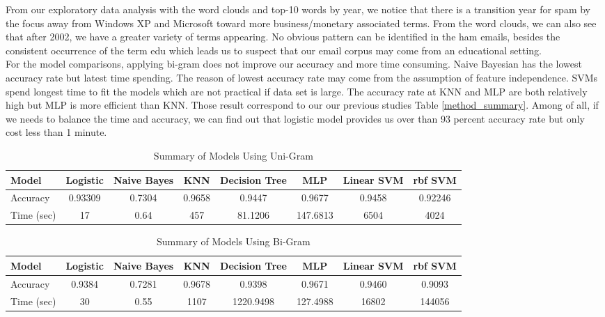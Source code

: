 From our exploratory data analysis with the word clouds and top-10 words by year, we notice that there is a transition year for spam by the focus away from Windows XP and Microsoft toward more business/monetary associated terms. From the word clouds, we can also see that after 2002, we have a greater variety of terms appearing. No obvious pattern can be identified in the ham emails, besides the consistent occurrence of the term edu which leads us to suspect that our email corpus may come from an educational setting.\\

For the model comparisons, applying bi-gram does not improve our accuracy and more time consuming. Naive Bayesian has the lowest accuracy rate but latest time spending. The reason of lowest accuracy rate may come from the assumption of feature independence. SVMs spend longest time to fit the models which are not practical if data set is large. The accuracy rate at KNN and MLP are both relatively high but MLP is more efficient than KNN. Those result correspond to our our previous studies Table \ref{method_summary}. Among of all, if we needs to balance the time and accuracy, we can find out that logistic model provides us over than 93 percent accuracy rate but only cost less than 1 minute.

\begin{table}[H]
	\centering
	\caption{Summary of Models Using Uni-Gram}
	\label{Summary-one-gram}
	\begin{tabular}{lccccccc}
		\hline
		Model    & Logistic  & Naive Bayes & KNN    & Decision Tree & MLP & Linear SVM  & rbf SVM \\ \hline
		Accuracy&  0.93309   & 0.7304       & 0.9658 & 0.9447        & 0.9677 & 0.9458  & 0.92246 \\
		Time (sec) & 17 & 0.64 &  457 & 81.1206  & 147.6813 & 6504       & 4024    \\ \hline
	\end{tabular}
\end{table}

\begin{table}[H]
	\centering
	\caption{Summary of Models Using Bi-Gram}
	\label{Summary-bi-gram}
	\begin{tabular}{lccccccc}
		\hline
		Model      & Logistic & Naive Bayes & KNN    & Decision Tree & MLP & Linear SVM & rbf SVM \\ \hline
		Accuracy   & 0.9384   & 0.7281      & 0.9678 & 0.9398        &     0.9671 & 0.9460     & 0.9093  \\
		Time (sec) & 30       & 0.55        & 1107   & 1220.9498     &    127.4988 & 16802      & 144056  \\ \hline
	\end{tabular}
\end{table}
